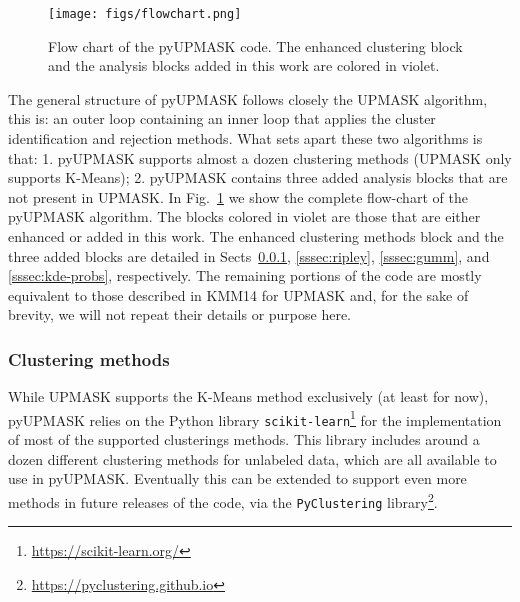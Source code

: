 \documentclass[draft]{aa}
\begin{document}
  \begin{figure}
   \centering
   \texttt{[image: figs/flowchart.png]}
   \caption{Flow chart of the pyUPMASK code. The enhanced clustering block and
   the analysis blocks added in this work are colored in violet.}
   \label{fig:flowchart}
  \end{figure}

  The general structure of pyUPMASK follows closely the UPMASK algorithm, this
  is: an outer loop containing an inner loop that applies the cluster
  identification and rejection methods. What sets apart these two algorithms
  is that: 1. pyUPMASK supports almost a dozen clustering
  methods (UPMASK only supports K-Means); 2. pyUPMASK contains
  three added analysis blocks that are not present in UPMASK.
  In Fig.~\ref{fig:flowchart} we show the complete flow-chart of the pyUPMASK
  algorithm. The blocks colored in violet are those that are either enhanced or
  added in this work.
  The enhanced clustering methods block and the three added blocks are detailed
  in Sects~\ref{sssec:clustering}, \ref{sssec:ripley},
  \ref{sssec:gumm}, and \ref{sssec:kde-probs}, respectively. The remaining
  portions of the code are mostly equivalent to those described in KMM14 for
  UPMASK and, for the sake of brevity, we will not repeat their details or
  purpose here.

 

\subsubsection{Clustering methods}
 \label{sssec:clustering}

 While UPMASK supports the K-Means method exclusively (at least for now),
 pyUPMASK relies on the Python library
 \texttt{scikit-learn}\footnote{\url{https://scikit-learn.org/}}
 \citep{scikit-learn} for the implementation of most of the supported
 clusterings methods. This library includes around a dozen different
 clustering methods for unlabeled data, which are all available to use in
 pyUPMASK. Eventually this can be extended to support even more methods
 in future releases of the code, via the \texttt{PyClustering}
 library\footnote{\url{https://pyclustering.github.io}}.\\
\end{document}
